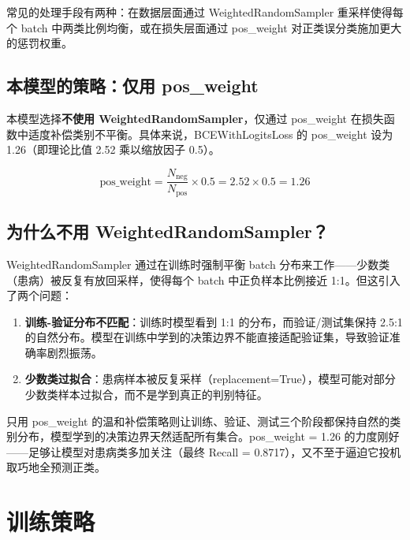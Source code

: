 \documentclass[12pt,a4paper]{ctexart}
\begin{document}
常见的处理手段有两种：在数据层面通过 WeightedRandomSampler 重采样使得每个 batch 中两类比例均衡，或在损失层面通过 pos\_weight 对正类误分类施加更大的惩罚权重。

\subsection{本模型的策略：仅用 pos\_weight}

本模型选择\textbf{不使用 WeightedRandomSampler}，仅通过 pos\_weight 在损失函数中适度补偿类别不平衡。具体来说，BCEWithLogitsLoss 的 pos\_weight 设为 1.26（即理论比值 2.52 乘以缩放因子 0.5）。

\[
\text{pos\_weight} = \frac{N_{\text{neg}}}{N_{\text{pos}}} \times 0.5 = 2.52 \times 0.5 = 1.26
\]

\subsection{为什么不用 WeightedRandomSampler？}

WeightedRandomSampler 通过在训练时强制平衡 batch 分布来工作——少数类（患病）被反复有放回采样，使得每个 batch 中正负样本比例接近 1:1。但这引入了两个问题：

\begin{enumerate}
\item \textbf{训练-验证分布不匹配}：训练时模型看到 1:1 的分布，而验证/测试集保持 2.5:1 的自然分布。模型在训练中学到的决策边界不能直接适配验证集，导致验证准确率剧烈振荡。
\item \textbf{少数类过拟合}：患病样本被反复采样（replacement=True），模型可能对部分少数类样本过拟合，而不是学到真正的判别特征。
\end{enumerate}

只用 pos\_weight 的温和补偿策略则让训练、验证、测试三个阶段都保持自然的类别分布，模型学到的决策边界天然适配所有集合。pos\_weight = 1.26 的力度刚好——足够让模型对患病类多加关注（最终 Recall = 0.8717），又不至于逼迫它投机取巧地全预测正类。

\section{训练策略}
\end{document}
